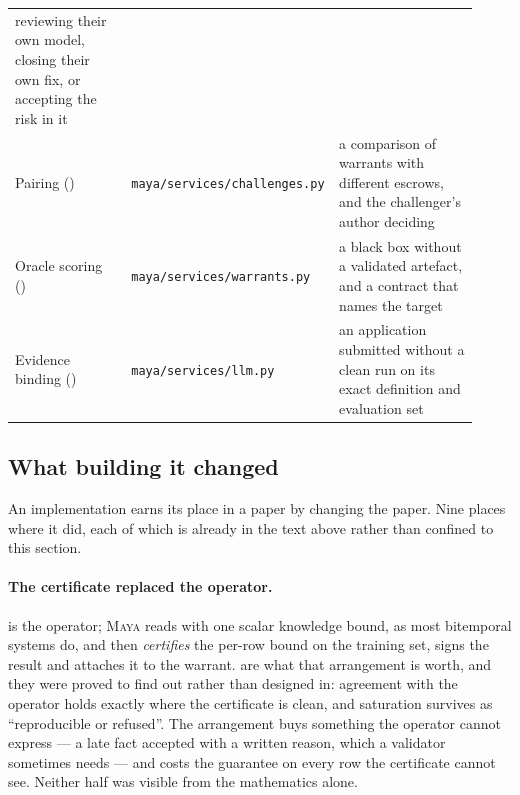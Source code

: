 \documentclass[11pt,a4paper]{article}
\renewcommand{\_}{\oldunderscore\allowbreak}
\theoremstyle{plain}
\theoremstyle{definition}
\theoremstyle{definition}
\theoremstyle{remark}
\begin{document}
\begin{center}
\begin{longtable}{@{}L{0.25\linewidth}L{0.37\linewidth}L{0.30\linewidth}@{}}
reviewing their own model, closing their own fix, or accepting the risk in it \\
Pairing () & \texttt{maya/services/challenges.py} & a comparison of warrants with
different escrows, and the challenger's author deciding \\
Oracle scoring () & \texttt{maya/services/warrants.py} & a black box without a
validated artefact, and a contract that names the target \\
Evidence binding () & \texttt{maya/services/llm.py} & an application submitted
without a clean run on its exact definition and evaluation set \\
\bottomrule
\end{longtable}
\end{center}

\subsection{What building it changed}

An implementation earns its place in a paper by changing the paper. Nine places where it did, each of
which is already in the text above rather than confined to this section.

\paragraph{The certificate replaced the operator.}  is the operator; \textsc{Maya} reads
with one scalar knowledge bound, as most bitemporal systems do, and then \emph{certifies} the per-row
bound on the training set, signs the result and attaches it to the warrant.
 are what that arrangement is worth, and they were proved to
find out rather than designed in: agreement with the operator holds exactly where the certificate is
clean, and saturation survives as ``reproducible or refused''. The arrangement buys something the
operator cannot express --- a late fact accepted with a written reason, which a validator sometimes needs
--- and costs the guarantee on every row the certificate cannot see. Neither half was visible from the
mathematics alone.
\end{document}

